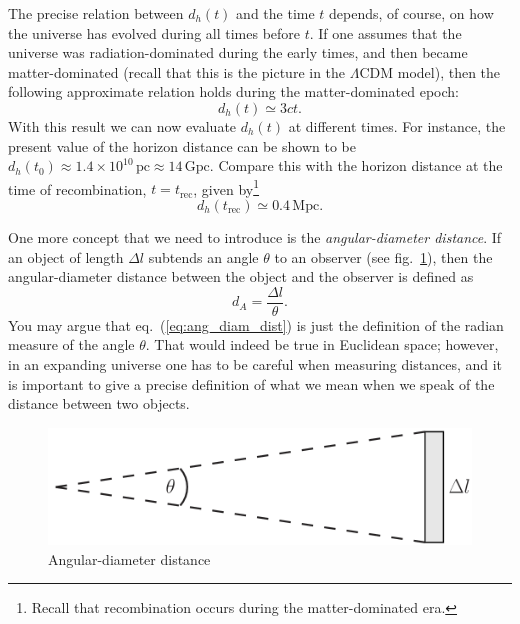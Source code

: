 \documentclass[11pt, a4paper,oneside,openright]{book}
\numberwithin{equation}{section}
\begin{document}
The precise relation between $d_h(t)$ and the time $t$ depends, of course, on how the universe has evolved during all times before $t$. If one assumes that the universe was radiation-dominated during the early times, and then became matter-dominated (recall that this is the picture in the $\Lambda$CDM model), then the following approximate relation holds during the matter-dominated epoch:
\begin{equation} \label{eq:horizon_dist_matter}
d_h(t)\simeq 3ct.
\end{equation}
With this result we can now evaluate $d_h(t)$ at different times. For instance, the present value of the horizon distance can be shown to be $d_h(t_0)\approx 1.4\times10^{10}\,{\mathrm{pc}}\approx14\,{\mathrm{Gpc}}$. Compare this with the horizon distance at the time of recombination, $t=t_{\mathrm{rec}}$, given by\footnote{Recall that recombination occurs during the matter-dominated era.}
\begin{equation}
d_h(t_{\mathrm{rec}})\simeq 0.4\,{\mathrm{Mpc}}.
\end{equation}

One more concept that we need to introduce is the {\it angular-diameter distance}. If an object of length $\Delta l$ subtends an angle $\theta$ to an observer (see fig.\ \ref{fig:lec12_3}), then the angular-diameter distance between the object and the observer is defined as
\begin{equation} \label{eq:ang_diam_dist}
d_A=\frac{\Delta l}{\theta}.
\end{equation}
You may argue that eq.\ (\ref{eq:ang_diam_dist}) is just the definition of the radian measure of the angle $\theta$. That would indeed be true in Euclidean space; however, in an expanding universe one has to be careful when measuring distances, and it is important to give a precise definition of what we mean when we speak of the distance between two objects.
\begin{figure}[ht]
\begin{center}
\includegraphics[scale=0.3]{Draw/lec12_3.png}
\end{center}
\caption{Angular-diameter distance}
\label{fig:lec12_3}
\end{figure}
\end{document}
